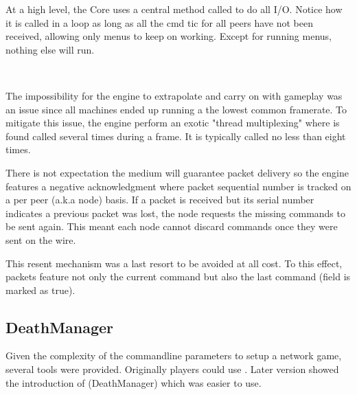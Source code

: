 At a high level, the Core uses a central method called  to do all I/O. Notice how it is called in a loop as long as all the cmd tic for all peers have not been received, allowing only menus to keep on working. Except for running menus, nothing else will run.\\
\par
{}\\
\par
The impossibility for the engine to extrapolate and carry on with gameplay was an issue since all machines ended up running a the lowest common framerate. To mitigate this issue, the engine perform an exotic "thread multiplexing" where  is found called several times during a frame. It is typically called no less than eight times.\\
\par
{}



There is not expectation the medium will guarantee packet delivery so the engine features a negative acknowledgment where packet sequential number is tracked on a per peer (a.k.a node) basis. If a packet is received but its serial number indicates a previous packet was lost, the node requests the missing commands to be sent again. This meant each node cannot discard commands once they were sent on the wire.\\
\par
This resent mechanism was a last resort to be avoided at all cost. To this effect, packets feature not only the current command but also the last command (field  is marked as true).\\





\subsection{DeathManager}
Given the complexity of the commandline parameters to setup a network game, several tools were provided. Originally players could use . Later version showed the introduction of  (DeathManager) which was easier to use.\\
\par
{}\\
\\
\par











